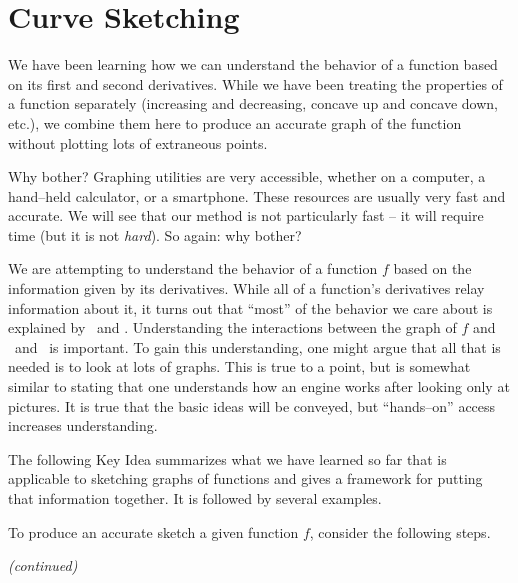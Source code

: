 \section{Curve Sketching}\label{sec:sketch}


We have been learning how we can understand the behavior of a function based on its first and second derivatives. While we have been treating the properties of a function separately (increasing and decreasing, concave up and concave down, etc.), we combine them here to produce an accurate graph of the function without plotting lots of extraneous points.

Why bother? Graphing utilities are very accessible, whether on a computer, a hand--held calculator, or a smartphone. These resources are usually very fast and accurate. We will see that our method is not particularly fast -- it will require time (but it is not \textit{hard}). So again: why bother?

We are attempting to understand the behavior of a function $f$ based on the information given by its derivatives. While all of a function's derivatives relay information about it, it turns out that ``most'' of the behavior we care about is explained by \fp\ and \fpp. Understanding the interactions between the graph of $f$ and \fp\ and \fpp\ is important. To gain this understanding, one might argue that all that is needed is to look at lots of graphs. This is true to a point, but is somewhat similar to stating that one understands how an engine works after looking only at pictures. It is true that the basic ideas will be conveyed, but ``hands--on'' access increases understanding.

The following Key Idea summarizes what we have learned so far that is applicable to sketching graphs of functions and gives a framework for putting that information together. It is followed by several examples.

{}
{To produce an accurate sketch a given function $f$, consider the following steps.
\iflatexml{}
\small\textit{(continued)}\normalsize
}

